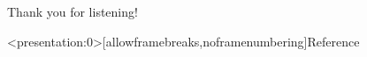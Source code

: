 \documentclass{beamer}
\begin{document}
\begin{frame}
\begin{center}
	\large
	Thank you for listening!
\end{center}
\end{frame}



\begin{frame}<presentation:0>[allowframebreaks,noframenumbering]{Reference}
	
	
\end{frame}
\end{document}
